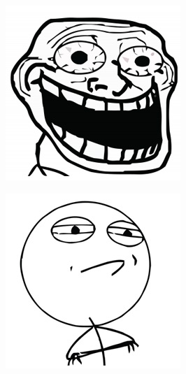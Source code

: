 \begin{multicols}{8}
\begin{center}
\includegraphics[width=\linewidth]{./IMG-GIT/MEMES/Meme-Faces-38.jpg}  
\end{center}

\begin{center}
\includegraphics[width=\linewidth]{./IMG-GIT/MEMES/Meme-Faces-46.jpg}  
\end{center}


\end{multicols}
